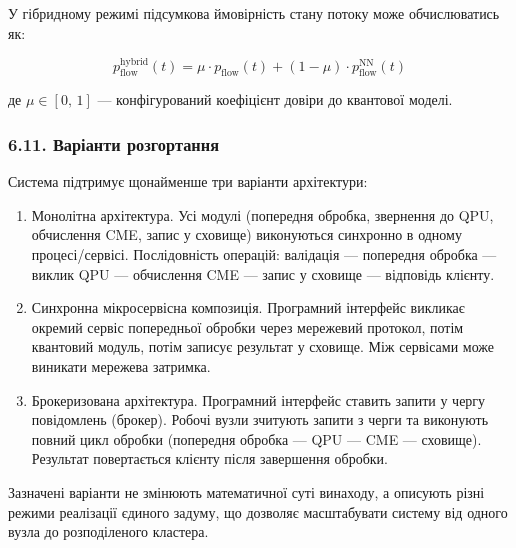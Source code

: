 \documentclass[12pt,a4paper]{article}
\begin{document}
У гібридному режимі підсумкова ймовірність стану потоку може обчислюватись як:



\[p_{\text{flow}}^{\text{hybrid}}(t) = \mu \cdot p_{\text{flow}}(t) + (1 - \mu) \cdot p_{\text{flow}}^{\text{NN}}(t)\]



де \(\mu \in [0,\,1]\) --- конфігурований коефіцієнт довіри до квантової моделі.



\subsubsection{6.11. Варіанти розгортання}\label{ux432ux430ux440ux456ux430ux43dux442ux438-ux440ux43eux437ux433ux43eux440ux442ux430ux43dux43dux44f}



Система підтримує щонайменше три варіанти архітектури:



\begin{enumerate}

\def\labelenumi{\Alph{enumi})}

\item

  Монолітна архітектура. Усі модулі (попередня обробка, звернення до QPU, обчислення CME, запис у сховище) виконуються синхронно в одному процесі/сервісі. Послідовність операцій: валідація --- попередня обробка --- виклик QPU --- обчислення CME --- запис у сховище --- відповідь клієнту.

\item

  Синхронна мікросервісна композиція. Програмний інтерфейс викликає окремий сервіс попередньої обробки через мережевий протокол, потім квантовий модуль, потім записує результат у сховище. Між сервісами може виникати мережева затримка.

\item

  Брокеризована архітектура. Програмний інтерфейс ставить запити у чергу повідомлень (брокер). Робочі вузли зчитують запити з черги та виконують повний цикл обробки (попередня обробка --- QPU --- CME --- сховище). Результат повертається клієнту після завершення обробки.

\end{enumerate}



Зазначені варіанти не змінюють математичної суті винаходу, а описують різні режими реалізації єдиного задуму, що дозволяє масштабувати систему від одного вузла до розподіленого кластера.
\end{document}
